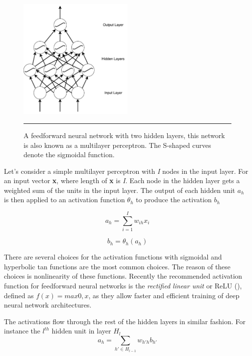     \def\layersep{2.5cm}
    \begin{figure}
    \centering
    \includegraphics[width=0.5\textwidth,height=0.5\textheight,keepaspectratio]
        {Figures/mlp.pdf}
        \rule{35em}{0.5pt}
    \caption[Multilayer perceptron]
    {A feedforward neural network with two hidden layers, this network is also known as a
    multilayer perceptron. The S-shaped curves denote the sigmoidal function.}
    \label{fig:ffnnetwork}
    \end{figure}

Let's consider a simple multilayer perceptron with \textit{I} nodes in the input layer. For an
input vector \textbf{x}, where length of \textbf{x} is \textit{I}. Each node in
the hidden layer gets a weighted sum of the units in the input layer. The output of each hidden unit
$a_{h}$ is then applied to an activation function $\theta_{h}$ to produce the activation $b_{h}$

    \begin{equation}
        a_{h} = \displaystyle\sum_{i=1}^\textit{I} w_{ih}x_{i}
    \end{equation}

    \begin{equation}
        b_{h} = \theta_{h}(a_{h})
    \end{equation}

There are several choices for the activation functions with sigmoidal and hyperbolic tan
functions are the most common choices. The reason of these choices is nonlinearity of
these functions. Recently the recommended activation function for feedforward neural networks is
the \emph{rectified linear unit} or ReLU (\citet{nair2010rectified}), defined as $f(x) = max{0,x}$,
as they allow faster and efficient training of deep neural network architectures.

The activations flow through the rest of the hidden layers in similar fashion. For instance the
$l^{th}$ hidden unit in layer $H_{l}$
    \begin{equation}
        a_{h} = \displaystyle\sum_{h' \in H_{l-1}} w_{h'h}b_{h'}
    \end{equation}


